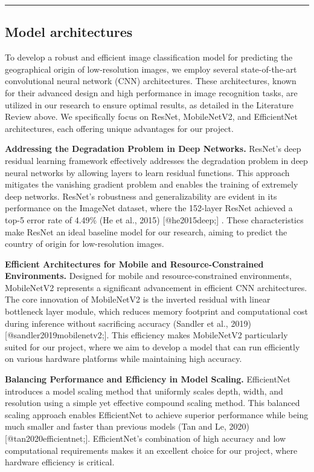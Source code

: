 \documentclass{article}
\begin{document}
\begin{center}\rule{0.5\linewidth}{0.5pt}\end{center}

\subsection{Model architectures}\label{model-architectures}

To develop a robust and efficient image classification model for
predicting the geographical origin of low-resolution images, we employ
several state-of-the-art convolutional neural network (CNN)
architectures. These architectures, known for their advanced design and
high performance in image recognition tasks, are utilized in our
research to ensure optimal results, as detailed in the Literature Review
above. We specifically focus on ResNet, MobileNetV2, and EfficientNet
architectures, each offering unique advantages for our project.

\textbf{Addressing the Degradation Problem in Deep Networks.} ResNet's
deep residual learning framework effectively addresses the degradation
problem in deep neural networks by allowing layers to learn residual
functions. This approach mitigates the vanishing gradient problem and
enables the training of extremely deep networks. ResNet's robustness and
generalizability are evident in its performance on the ImageNet dataset,
where the 152-layer ResNet achieved a top-5 error rate of 4.49\% (He et
al., 2015) {[}@he2015deep;{]} . These characteristics make ResNet an
ideal baseline model for our research, aiming to predict the country of
origin for low-resolution images.

\textbf{Efficient Architectures for Mobile and Resource-Constrained
Environments.} Designed for mobile and resource-constrained
environments, MobileNetV2 represents a significant advancement in
efficient CNN architectures. The core innovation of MobileNetV2 is the
inverted residual with linear bottleneck layer module, which reduces
memory footprint and computational cost during inference without
sacrificing accuracy (Sandler et al., 2019)
{[}@sandler2019mobilenetv2;{]}. This efficiency makes MobileNetV2
particularly suited for our project, where we aim to develop a model
that can run efficiently on various hardware platforms while maintaining
high accuracy.

\textbf{Balancing Performance and Efficiency in Model Scaling.}
EfficientNet introduces a model scaling method that uniformly scales
depth, width, and resolution using a simple yet effective compound
scaling method. This balanced scaling approach enables EfficientNet to
achieve superior performance while being much smaller and faster than
previous models (Tan and Le, 2020) {[}@tan2020efficientnet;{]}.
EfficientNet's combination of high accuracy and low computational
requirements makes it an excellent choice for our project, where
hardware efficiency is critical.
\end{document}
